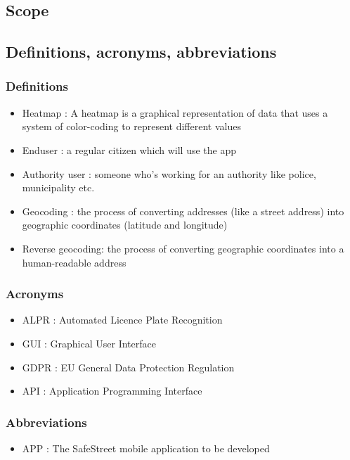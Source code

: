 \subsection{Scope}




\subsection{Definitions,  acronyms,  abbreviations}

\subsubsection{Definitions}
\begin{itemize}
  \item Heatmap : A heatmap is a graphical representation of data that uses a system of color-coding to represent different values
  \item Enduser : a regular citizen which will use the app
  \item Authority user : someone who's working for an authority like police, municipality etc.
  \item Geocoding : the process of converting addresses (like a street address) into geographic coordinates (latitude and longitude)
  \item Reverse geocoding:  the process of converting geographic coordinates into a human-readable address

\end{itemize}

\subsubsection{Acronyms}
\begin{itemize}
  \item ALPR : Automated Licence Plate Recognition
  \item GUI : Graphical User Interface
  \item GDPR : EU General Data Protection Regulation
  \item API : Application Programming Interface
\end{itemize}

\subsubsection{Abbreviations}
\begin{itemize}
  \item APP : The SafeStreet mobile application to be developed   
\end{itemize}

